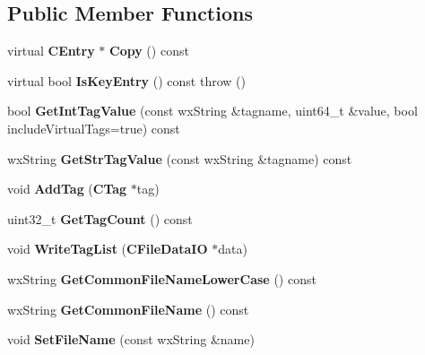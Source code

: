 \subsection*{Public Member Functions}
\begin{DoxyCompactItemize}
\item 
virtual {\bf CEntry} $\ast$ {\bfseries Copy} () const \label{classKademlia_1_1CEntry_a184ea349b0f5dbd863cb3b96241bdb56}

\item 
virtual bool {\bfseries IsKeyEntry} () const   throw ()\label{classKademlia_1_1CEntry_aeee58ed558188fde567e627864ce4ebb}

\item 
bool {\bfseries GetIntTagValue} (const wxString \&tagname, uint64\_\-t \&value, bool includeVirtualTags=true) const \label{classKademlia_1_1CEntry_ac7d701970bff2c00d7ac4ddfb74235d1}

\item 
wxString {\bfseries GetStrTagValue} (const wxString \&tagname) const \label{classKademlia_1_1CEntry_a1b6dc9d08520fcd34f188cf9f8380215}

\item 
void {\bfseries AddTag} ({\bf CTag} $\ast$tag)\label{classKademlia_1_1CEntry_a218c1c33e24427cae500f0bdd0451633}

\item 
uint32\_\-t {\bfseries GetTagCount} () const \label{classKademlia_1_1CEntry_ac404e9472515bb6f72ae86547b996243}

\item 
void {\bfseries WriteTagList} ({\bf CFileDataIO} $\ast$data)\label{classKademlia_1_1CEntry_a22efb21fc98e63d9ccd4cc6f2e09bf25}

\item 
wxString {\bfseries GetCommonFileNameLowerCase} () const \label{classKademlia_1_1CEntry_a29f3190c1e7d771393bb49c61ced2d86}

\item 
wxString {\bfseries GetCommonFileName} () const \label{classKademlia_1_1CEntry_ae48d27bc405937b6ef11f594d15af2c0}

\item 
void {\bfseries SetFileName} (const wxString \&name)\label{classKademlia_1_1CEntry_ade5bdd1bfbf8d234f3421aaf7cf6101f}

\end{DoxyCompactItemize}
